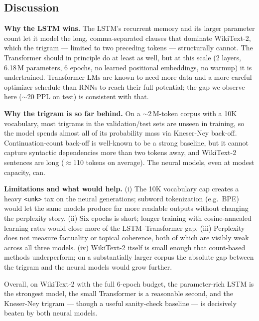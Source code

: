 \subsection{Discussion}

\textbf{Why the LSTM wins.} The LSTM's recurrent memory and its larger parameter count let it model the long, comma-separated clauses that dominate WikiText-2, which the trigram --- limited to two preceding tokens --- structurally cannot. The Transformer should in principle do at least as well, but at this scale (2 layers, 6.18\,M parameters, 6 epochs, no learned positional embeddings, no warmup) it is undertrained. Transformer LMs are known to need more data and a more careful optimizer schedule than RNNs to reach their full potential; the gap we observe here ($\sim$20 PPL on test) is consistent with that.

\textbf{Why the trigram is so far behind.} On a $\sim$2\,M-token corpus with a 10K vocabulary, most trigrams in the validation/test sets are unseen in training, so the model spends almost all of its probability mass via Kneser-Ney back-off. Continuation-count back-off is well-known to be a strong baseline, but it cannot capture syntactic dependencies more than two tokens away, and WikiText-2 sentences are long ($\approx$110 tokens on average). The neural models, even at modest capacity, can.

\textbf{Limitations and what would help.} (i) The 10K vocabulary cap creates a heavy \texttt{<unk>} tax on the neural generations; subword tokenization (e.g.\ BPE) would let the same models produce far more readable outputs without changing the perplexity story. (ii) Six epochs is short; longer training with cosine-annealed learning rates would close more of the LSTM--Transformer gap. (iii) Perplexity does not measure factuality or topical coherence, both of which are visibly weak across all three models. (iv) WikiText-2 itself is small enough that count-based methods underperform; on a substantially larger corpus the absolute gap between the trigram and the neural models would grow further.

Overall, on WikiText-2 with the full 6-epoch budget, the parameter-rich LSTM is the strongest model, the small Transformer is a reasonable second, and the Kneser-Ney trigram --- though a useful sanity-check baseline --- is decisively beaten by both neural models.

